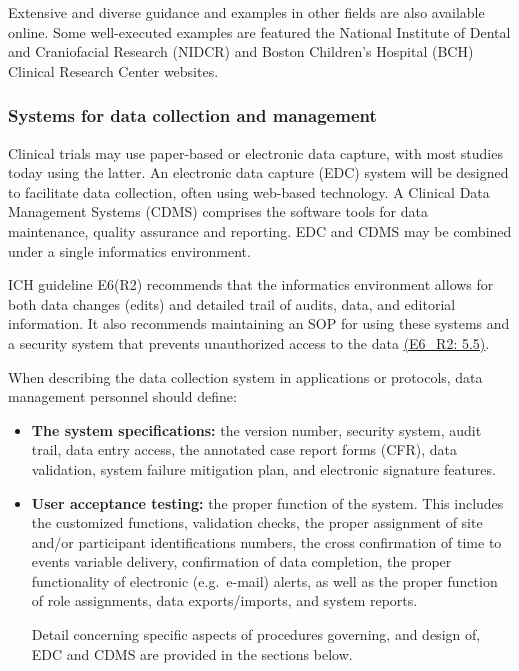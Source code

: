 \documentclass[]{book}
\theoremstyle{definition}
\theoremstyle{definition}
\theoremstyle{definition}
\theoremstyle{remark}
\begin{document}
Extensive and diverse guidance and examples in other fields are also
available online. Some well-executed examples are featured the National
Institute of Dental and Craniofacial Research (NIDCR) and Boston
Children's Hospital (BCH) Clinical Research Center websites.

\subsubsection{Systems for data collection and
management}\label{systems-for-data-collection-and-management}

Clinical trials may use paper-based or electronic data capture, with
most studies today using the latter. An electronic data capture (EDC)
system will be designed to facilitate data collection, often using
web-based technology. A Clinical Data Management Systems (CDMS)
comprises the software tools for data maintenance, quality assurance and
reporting. EDC and CDMS may be combined under a single informatics
environment.

ICH guideline E6(R2) recommends that the informatics environment allows
for both data changes (edits) and detailed trail of audits, data, and
editorial information. It also recommends maintaining an SOP for using
these systems and a security system that prevents unauthorized access to
the data
\href{http://www.ich.org/fileadmin/Public_Web_Site/ICH_Products/Guidelines/Efficacy/E6/E6_R2__Addendum_Step2.pdf}{(E6\_R2:
5.5)}.

When describing the data collection system in applications or protocols,
data management personnel should define:

\begin{itemize}
\item
  \textbf{The system specifications:} the version number, security
  system, audit trail, data entry access, the annotated case report
  forms (CFR), data validation, system failure mitigation plan, and
  electronic signature features.
\item
  \textbf{User acceptance testing:} the proper function of the system.
  This includes the customized functions, validation checks, the proper
  assignment of site and/or participant identifications numbers, the
  cross confirmation of time to events variable delivery, confirmation
  of data completion, the proper functionality of electronic
  (e.g.~e-mail) alerts, as well as the proper function of role
  assignments, data exports/imports, and system reports.

  Detail concerning specific aspects of procedures governing, and design
  of, EDC and CDMS are provided in the sections below.
\end{itemize}
\end{document}
